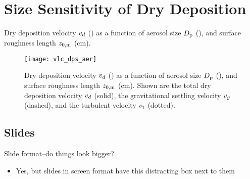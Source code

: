 \documentclass[12pt]{article}
\begin{document}
\section{Size Sensitivity of Dry Deposition}
Dry deposition velocity $v_{d}$ (\cmxs) as a function of aerosol
size $D_{\mathrm{\mathrm{p}}}$ (\um), and surface roughness length $z_{0,\mathrm{m}}$ (cm).
\begin{figure*}
\texttt{[image: vlc\_dps\_aer]}\vfill
\caption[Dry Deposition Velocity]{
Dry deposition velocity $v_{d}$ (\cmxs) as a function of aerosol
size $D_{\mathrm{\mathrm{p}}}$ (\um), and surface roughness length $z_{0,\mathrm{m}}$ (cm).
Shown are the total dry deposition velocity $v_{d}$ (solid), 
the gravitational settling velocity $v_{g}$ (dashed), and the
turbulent velocity $v_{\mathrm{t}}$ (dotted).
\label{fgr:vlc_dps_aer}}
\end{figure*}
\vfill
\clearpage

\begin{slide}
\section[Slides]{Slides}
Slide format--do things look bigger?
\begin{itemize}
\item Yes, but slides in screen format have this distracting box next
to them
\end{itemize}
\end{slide}
\vfill
\end{document}
